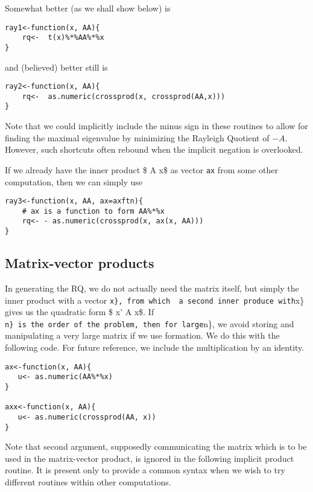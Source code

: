Somewhat better (as we shall show below) is

\begin{verbatim}
ray1<-function(x, AA){
    rq<-  t(x)%*%AA%*%x
}
\end{verbatim}

and (believed) better still is

\begin{verbatim}
ray2<-function(x, AA){
    rq<-  as.numeric(crossprod(x, crossprod(AA,x)))
}
\end{verbatim}

Note that we could implicitly include the minus sign in these
routines to allow for finding the maximal eigenvalue by minimizing
the Rayleigh Quotient of \(-A\). However, such shortcuts often rebound when
the implicit negation is overlooked.

If we already have the inner product \$ A x\$ as vector \texttt{ax} from some other
computation, then we can simply use

\begin{verbatim}
ray3<-function(x, AA, ax=axftn){
    # ax is a function to form AA%*%x 
    rq<- - as.numeric(crossprod(x, ax(x, AA)))
}
\end{verbatim}

\subsection{Matrix-vector products}\label{matrix-vector-products}

In generating the RQ, we do not actually need the matrix itself,
but simply the inner product with a vector \texttt{x\},\ from\ which\ \ a\ second\ inner\ produce\ with}x\} gives us the quadratic form
\$ x' A x\$. If \texttt{n\}\ is\ the\ order\ of\ the\ problem,\ then\ for\ large}n\}, we avoid storing and manipulating a very large matrix if
we use  formation. We do this with the
following code. For future reference, we include the multiplication
by an identity.

\begin{verbatim}
ax<-function(x, AA){
   u<- as.numeric(AA%*%x)
}

axx<-function(x, AA){
   u<- as.numeric(crossprod(AA, x))
}
\end{verbatim}

Note that second argument, supposedly communicating the matrix which is
to be used in the matrix-vector product, is ignored in the following
implicit product routine. It is present only to provide a common syntax
when we wish to try different routines within other computations.

